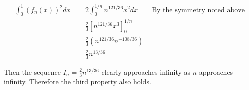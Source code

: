 \documentclass{article}
\begin{document}
\begin{align*}
    \int_0^1 (f_n(x))^2dx &= 2\int_0^{1/n} n^{121/36}x^2dx \qquad \text{By the symmetry noted above} \\
    &= \frac{2}{3}\left[n^{121/36}x^3\right]_0^{1/n} \\
    &= \frac{2}{3}\left(n^{121/36}n^{-108/36}\right)\\
    &= \frac{2}{3}n^{13/36}
\end{align*}

Then the sequence $I_n = \frac{2}{3}n^{13/36}$ clearly approaches infinity as $n$ approaches infinity. 
Therefore the third property also holds.
\end{document}
